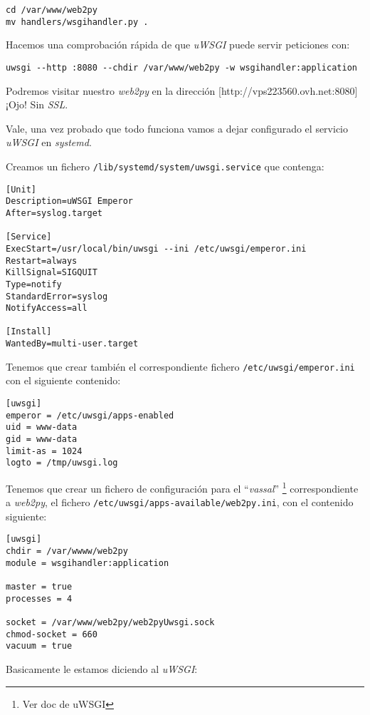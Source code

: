 \documentclass[12pt,spanish,]{article}
\begin{document}
\begin{verbatim}
cd /var/www/web2py
mv handlers/wsgihandler.py .
\end{verbatim}

Hacemos una comprobación rápida de que \emph{uWSGI} puede servir
peticiones con:

\begin{verbatim}
uwsgi --http :8080 --chdir /var/www/web2py -w wsgihandler:application
\end{verbatim}

Podremos visitar nuestro \emph{web2py} en la dirección
{[}http://vps223560.ovh.net:8080{]} ¡Ojo! Sin \emph{SSL}.

Vale, una vez probado que todo funciona vamos a dejar configurado el
servicio \emph{uWSGI} en \emph{systemd}.

Creamos un fichero \texttt{/lib/systemd/system/uwsgi.service} que
contenga:

\begin{verbatim}
[Unit]
Description=uWSGI Emperor
After=syslog.target

[Service]
ExecStart=/usr/local/bin/uwsgi --ini /etc/uwsgi/emperor.ini
Restart=always
KillSignal=SIGQUIT
Type=notify
StandardError=syslog
NotifyAccess=all

[Install]
WantedBy=multi-user.target
\end{verbatim}

Tenemos que crear también el correspondiente fichero
\texttt{/etc/uwsgi/emperor.ini} con el siguiente contenido:

\begin{verbatim}
[uwsgi]
emperor = /etc/uwsgi/apps-enabled
uid = www-data
gid = www-data
limit-as = 1024
logto = /tmp/uwsgi.log
\end{verbatim}

Tenemos que crear un fichero de configuración para el ``\emph{vassal}''
\footnote{Ver doc de uWSGI} correspondiente a \emph{web2py}, el fichero
\texttt{/etc/uwsgi/apps-available/web2py.ini}, con el contenido
siguiente:

\begin{verbatim}
[uwsgi]
chdir = /var/wwww/web2py
module = wsgihandler:application

master = true
processes = 4

socket = /var/www/web2py/web2pyUwsgi.sock
chmod-socket = 660
vacuum = true
\end{verbatim}

Basicamente le estamos diciendo al \emph{uWSGI}:
\end{document}
